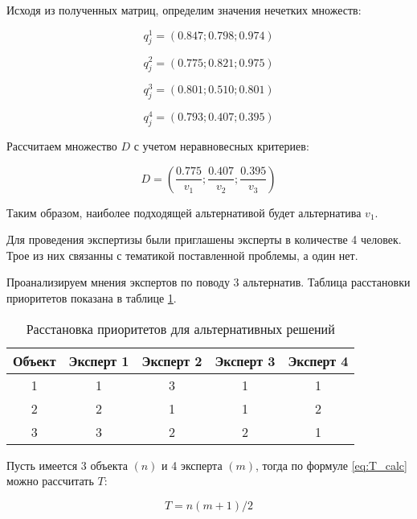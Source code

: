 Исходя из полученных матриц, определим значения нечетких множеств:

\begin{equation}
    q^1_j=(0.847;0.798;0.974) 
\end{equation}

\begin{equation}
    q^2_j=(0.775;0.821;0.975)
\end{equation}

\begin{equation}
    q^3_j=(0.801;0.510;0.801)
\end{equation}

\begin{equation}
    q^4_j=(0.793;0.407;0.395)
\end{equation}

Рассчитаем множество $D$ с учетом неравновесных критериев:

\begin{equation}
    D=(\frac{0.775}{v_1};\frac{0.407}{v_2};\frac{0.395}{v_3})
\end{equation}

Таким образом, наиболее подходящей альтернативой будет альтернатива $v_1$.

Для проведения экспертизы были приглашены эксперты в количестве 4 человек. Трое из них связанны с тематикой поставленной проблемы, а один нет.

Проанализируем мнения экспертов по поводу 3 альтернатив. Таблица расстановки приоритетов показана в таблице \ref{table:experts_priority}. 

\begin{table}[H]
    \centering
    \caption{Расстановка приоритетов для альтернативных решений}\label{table:experts_priority}
    \begin{tabular}{|c|c|c|c|c|}
    \hline Объект & Эксперт 1 & Эксперт 2 & Эксперт 3 & Эксперт 4 \\
    \hline 1 & 1 & 3 & 1 & 1  \\
    \hline 2 & 2 & 1 & 1 &  2 \\
    \hline 3 & 3 & 2 & 2 & 1 \\
    \hline
    \end{tabular}
\end{table}

Пусть имеется 3 объекта $(n)$ и 4 эксперта $(m)$, тогда по формуле \ref{eq:T_calc} можно рассчитать $T$:

\begin{equation}
    \label{eq:T_calc}
    T=n(m+1)/2
\end{equation}
\vspace{1em}

